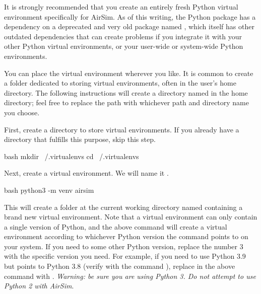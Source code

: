 It is strongly recommended that you create an entirely fresh Python virtual environment specifically for AirSim. As of this writing, the  Python package has a dependency on a deprecated and very old package named , which itself has other outdated dependencies that can create problems if you integrate it with your other Python virtual environments, or your user-wide or system-wide Python environments.

You can place the virtual environment wherever you like. It is common to create a folder dedicated to storing virtual environments, often in the user's home directory. The following instructions will create a directory named  in the home directory; feel free to replace the path with whichever path and directory name you choose.

First, create a directory to store virtual environments. If you already have a directory that fulfills this purpose, skip this step.
\begin{minttcb}{bash}
    mkdir ~/.virtualenvs
    cd ~/.virtualenvs
\end{minttcb}
\noindent Next, create a virtual environment. We will name it .
\begin{minttcb}{bash}
    python3 -m venv airsim
\end{minttcb}
This will create a folder at the current working directory named  containing a brand new virtual environment. Note that a virtual environment can only contain a single version of Python, and the above command will create a virtual environment according to whichever Python version the  command points to on your system. If you need to some other Python version, replace the number 3 with the specific version you need. For example, if you need to use Python 3.9 but  points to Python 3.8 (verify with the command ), replace  in the above command with . \textit{Warning: be sure you are using Python 3. Do not attempt to use Python 2 with AirSim}.

